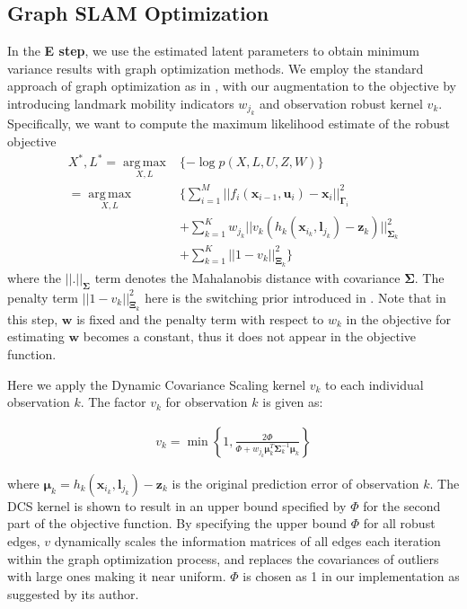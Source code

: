 \subsection{Graph SLAM Optimization}

In the \textbf{E step}, we use the estimated latent parameters to obtain minimum variance results with graph optimization methods. We employ the standard approach of graph optimization as in \cite{g2o}, with our augmentation to the objective by introducing landmark mobility indicators $w_{j_k}$ and observation robust kernel $v_k$. Specifically, we want to compute the maximum likelihood estimate of the robust objective
\begin{equation}
\begin{aligned}
X^*, L^* = \operatorname*{arg\,max}_{X, L} & \{ -\log p(X, L, U, Z, W) \}\\
=\operatorname*{arg\,max}_{X, L} & \{ \sum_{i=1}^M||f_i(\boldsymbol{x}_{i-1}, \boldsymbol{u}_i) - \boldsymbol{x}_i||^2_{\boldsymbol{\Gamma}_i} \\
&+ \sum_{k=1}^K w_{j_k}|| v_k (h_k(\boldsymbol{x}_{i_k}, \boldsymbol{l}_{j_k}) - \boldsymbol{z}_k)||^2_{\boldsymbol{\Sigma}_k} \\ 
&+ \sum_{k=1}^K ||1 - v_k||^2_{\boldsymbol{\Xi}_k} \}
\end{aligned}
\label{eq:MAP}
\end{equation}
where the $||.||_{\boldsymbol{\Sigma}}$ term denotes the Mahalanobis distance with covariance $\boldsymbol{\Sigma}$. The penalty term $|| 1 - v_k||^2_{\boldsymbol{\Xi}_k}$ here is the switching prior introduced in \cite{Switchable12}. Note that in this step, $\boldsymbol{w}$ is fixed and the penalty term with respect to $w_k$ in the objective for estimating $\boldsymbol{w}$ becomes a constant, thus it does not appear in the objective function.

Here we apply the Dynamic Covariance Scaling\cite{DCS} kernel $v_k$ to each individual observation $k$. The factor $v_k$ for observation $k$ is given as:

\begin{equation}
\begin{aligned}
v_k = \min \left\{ 1, \frac{2\Phi}{\Phi + w_{j_k}\boldsymbol{\mu}_k^T \boldsymbol{\Sigma}_k^{-1} \boldsymbol{\mu}_k}\right\}
\end{aligned}
\label{eq:DCS}
\end{equation}

where $\boldsymbol{\mu}_k = h_k(\boldsymbol{x}_{i_k}, \boldsymbol{l}_{j_k}) - \boldsymbol{z}_k$ is the original prediction error of observation $k$. The DCS kernel is shown to result in an upper bound specified by $\Phi$ for the second part of the objective function. By specifying the upper bound $\Phi$ for all robust edges, $v$ dynamically scales the information matrices of all edges each iteration within the graph optimization process, and replaces the covariances of outliers with large ones making it near uniform. $\Phi$ is chosen as 1 in our implementation as suggested by its author. 

